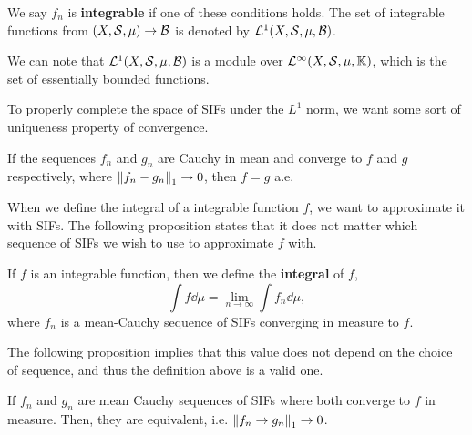 \begin{definition}
    We say $f_n$ is \textbf{integrable} if one of these conditions holds. The set of integrable functions from $(X, \mathcal S, \mu) \to \mathcal B$ is denoted by $\mathcal L^1(X, \mathcal S, \mu, \mathcal B)$.
\end{definition}

We can note that $\mathcal L^1(X, \mathcal S, \mu, \mathcal B)$ is a module over $\mathcal L^\infty(X, \mathcal S, \mu, \mathbb K)$, which is the set of essentially bounded functions.


To properly complete the space of SIFs under the $L^1$ norm, we want some sort of uniqueness property of convergence.

\begin{proposition}
    If the sequences $f_n$ and  $g_n$ are Cauchy in mean and converge to $f$ and $g$ respectively, where $\norm{f_n -g_n}_1 \to 0$, then $f = g$ a.e.
\end{proposition}

When we define the integral of a integrable function $f$, we want to approximate it with SIFs. The following proposition states that it does not matter which sequence of SIFs we wish to use to approximate $f$ with.


\begin{definition}
    If $f$ is an integrable function, then we define the \textbf{integral} of $f$, \[\int f \dd{\mu} = \lim_{n \to \infty} \int f_n \dd{\mu},\] where $f_n$ is a mean-Cauchy sequence of SIFs converging in measure to $f$.
\end{definition}

The following proposition implies that this value does not depend on the choice of sequence, and thus the definition above is a valid one.

\begin{proposition}
    If $f_n$ and $g_n$ are mean Cauchy sequences of SIFs where both converge to $f$ in measure. Then, they are equivalent, i.e. $\norm{f_n \to g_n}_1 \to 0$.
\end{proposition}

